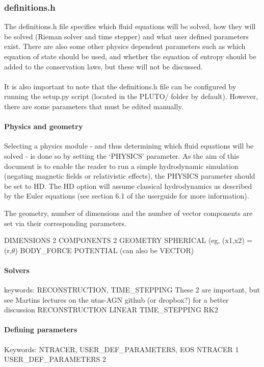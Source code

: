 \documentclass[12pt]{article}
\begin{document}
\subsubsection{definitions.h}
The definitions.h file specifies which fluid equations will be solved, how they will be solved (Rieman solver and time stepper) and what user defined parameters exist. There are also some other physics dependent parameters such as which equation of state should be used, and whether the equation of entropy should be added to the conservation laws, but these will not be discussed.\\
\\
It is also important to note that the definitions.h file can be configured by running the setup.py script (located in the PLUTO/ folder by default). However, there are some parameters that must be edited manually.

\paragraph{Physics and geometry}\mbox{}
\newline
Selecting a physics module - and thus determining which fluid equations will be solved - is done so by setting the `PHYSICS' parameter. As the aim of this document is to enable the reader to run a simple hydrodynamic simulation (negating magnetic fields or relativistic effects), the PHYSICS parameter should be set to HD. The HD option will assume classical hydrodynamics as described by the Euler equations (see section 6.1 of the userguide for more information).

The geometry, number of dimensions and the number of vector components are set via their corresponding parameters.

DIMENSIONS              2
COMPONENTS              2
GEOMETRY                SPHERICAL (eg, (x1,x2) = (r,$\theta$)
BODY\_FORCE              POTENTIAL (can also be VECTOR)

\paragraph{Solvers}
keywords: RECONSTRUCTION, TIME\_STEPPING
These 2 are important, but see Martins lectures on the utas-AGN github (or dropbox?) for a better discussion
RECONSTRUCTION          LINEAR
TIME\_STEPPING           RK2


\paragraph{Defining parameters}
Keywords: NTRACER, USER\_DEF\_PARAMETERS, EOS
NTRACER                 1
USER\_DEF\_PARAMETERS     2
\end{document}

